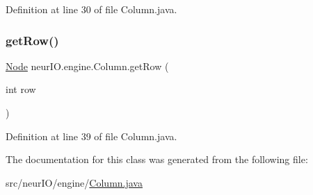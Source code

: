 Definition at line 30 of file Column.\+java.

\mbox{\label{classneur_i_o_1_1engine_1_1_column_a7de8bbe0cd9eb4c051e8cb2cd94682c2}} 
\subsubsection{\texorpdfstring{get\+Row()}{getRow()}}
{\footnotesize\ttfamily \hyperlink{classneur_i_o_1_1system_1_1_node}{Node} neur\+I\+O.\+engine.\+Column.\+get\+Row (\begin{DoxyParamCaption}\item[{int}]{row }\end{DoxyParamCaption})}



Definition at line 39 of file Column.\+java.



The documentation for this class was generated from the following file\+:\begin{DoxyCompactItemize}
\item 
src/neur\+I\+O/engine/\hyperlink{_column_8java}{Column.\+java}\end{DoxyCompactItemize}
